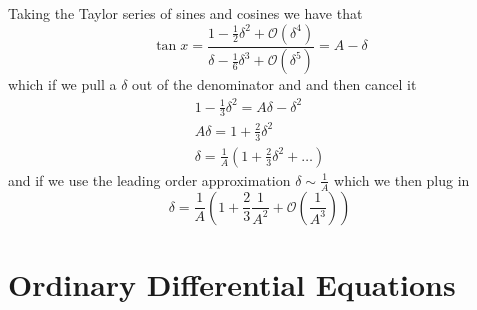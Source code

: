 \documentclass{article}
\begin{document}
Taking the Taylor series of sines and cosines we have that 
\begin{equation*}
    \tan x =\frac{1-\tfrac{1}{2}\delta^2+\mathcal{O}(\delta^4)}{\delta -\tfrac{1}{6}\delta^3+\mathcal{O}(\delta^5)} = A-\delta
\end{equation*}
which if we pull a $\delta $ out of the denominator and and then cancel it 
\begin{equation*}
    \begin{split}
        1-\frac{1}{3}\delta^2=A\delta-\delta^2 \\
        A\delta =1+\frac{2}{3}\delta^2 \\
        \delta =\frac{1}{A}\left(1+\frac{2}{3}\delta^2+\ldots \right)
    \end{split}
\end{equation*}
and if we use the leading order approximation $\delta \sim \frac{1}{A}$ which we then plug in 
\begin{equation*}
    \delta = \frac{1}{A}\left( 1+\frac{2}{3}\frac{1}{A^2}+\mathcal{O}\left( \frac{1}{A^3}\right) \right)
\end{equation*}

\section{Ordinary Differential Equations}
\end{document}
